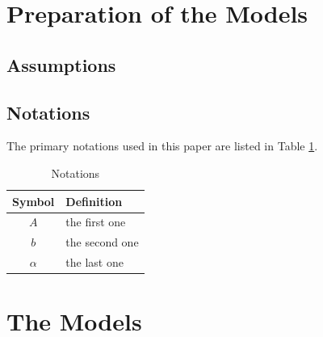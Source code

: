 \documentclass[12pt]{article}  %
\begin{document}
\section{Preparation of the Models}
\subsection{Assumptions}

\subsection{Notations}
The primary notations used in this paper are listed in Table \ref{tb:notation}.
\begin{table}[!htbp]
\begin{center}
\caption{Notations}
\begin{tabular}{cl}
	\toprule
	\multicolumn{1}{m{3cm}}{\centering Symbol}
	&\multicolumn{1}{m{8cm}}{\centering Definition}\\
	\midrule
	$A$&the first one\\
	$b$&the second one\\
	$\alpha$ &the last one\\
	\bottomrule
\end{tabular}\label{tb:notation}
\end{center}
\end{table}

\section{The Models}
\end{document}

